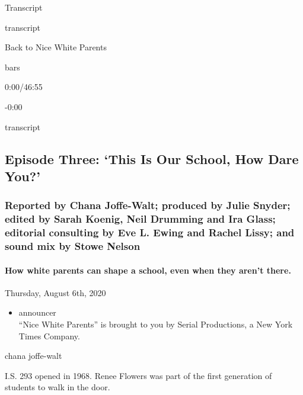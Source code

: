 Transcript

transcript

Back to Nice White Parents

bars

0:00/46:55

-0:00

transcript

\hypertarget{episode-three-this-is-our-school-how-dare-you-2}{%
\subsection{Episode Three: `This Is Our School, How Dare
You?'}\label{episode-three-this-is-our-school-how-dare-you-2}}

\hypertarget{reported-by-chana-joffe-walt-produced-by-julie-snyder-edited-by-sarah-koenig-neil-drumming-and-ira-glass-editorial-consulting-by-eve-l-ewing-and-rachel-lissy-and-sound-mix-by-stowe-nelson-1}{%
\subsubsection{Reported by Chana Joffe-Walt; produced by Julie Snyder;
edited by Sarah Koenig, Neil Drumming and Ira Glass; editorial
consulting by Eve L. Ewing and Rachel Lissy; and sound mix by Stowe
Nelson}\label{reported-by-chana-joffe-walt-produced-by-julie-snyder-edited-by-sarah-koenig-neil-drumming-and-ira-glass-editorial-consulting-by-eve-l-ewing-and-rachel-lissy-and-sound-mix-by-stowe-nelson-1}}

\hypertarget{how-white-parents-can-shape-a-school-even-when-they-arent-there-2}{%
\paragraph{How white parents can shape a school, even when they aren't
there.}\label{how-white-parents-can-shape-a-school-even-when-they-arent-there-2}}

Thursday, August 6th, 2020

\begin{itemize}
\tightlist
\item
  announcer\\
  ``Nice White Parents'' is brought to you by Serial Productions, a New
  York Times Company.
\end{itemize}

chana joffe-walt

I.S. 293 opened in 1968. Renee Flowers was part of the first generation
of students to walk in the door.

